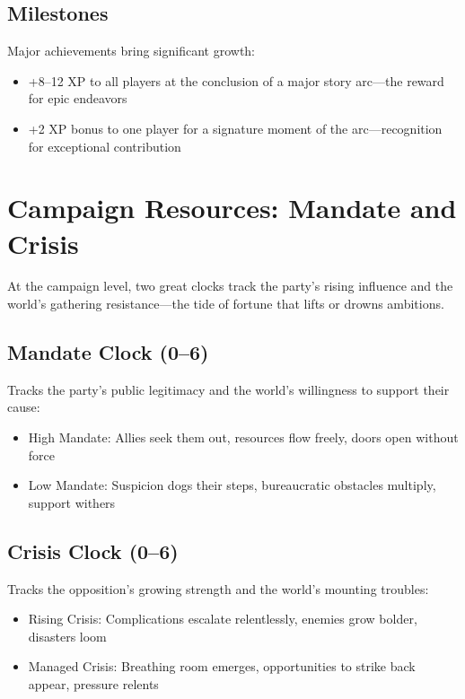 \subsection*{Milestones}

Major achievements bring significant growth:

\begin{itemize}
    \item +8--12 XP to all players at the conclusion of a major story arc—the reward for epic endeavors
    \item +2 XP bonus to one player for a signature moment of the arc—recognition for exceptional contribution
\end{itemize}

\section*{Campaign Resources: Mandate and Crisis}

At the campaign level, two great clocks track the party's rising influence and the world's gathering resistance—the tide of fortune that lifts or drowns ambitions.

\subsection*{Mandate Clock (0--6)}

Tracks the party's public legitimacy and the world's willingness to support their cause:
\begin{itemize}
    \item High Mandate: Allies seek them out, resources flow freely, doors open without force
    \item Low Mandate: Suspicion dogs their steps, bureaucratic obstacles multiply, support withers
\end{itemize}

\subsection*{Crisis Clock (0--6)}

Tracks the opposition's growing strength and the world's mounting troubles:
\begin{itemize}
    \item Rising Crisis: Complications escalate relentlessly, enemies grow bolder, disasters loom
    \item Managed Crisis: Breathing room emerges, opportunities to strike back appear, pressure relents
\end{itemize}

